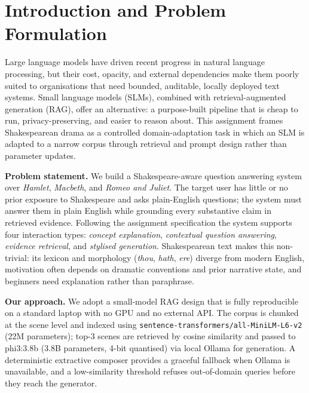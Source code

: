 \documentclass[10pt,conference]{IEEEtran}
\begin{document}
\section{Introduction and Problem Formulation}
\label{sec:introduction}


Large language models have driven recent progress in natural language
processing, but their cost, opacity, and external dependencies make
them poorly suited to organisations that need bounded, auditable,
locally deployed text systems. Small language models (SLMs), combined
with retrieval-augmented generation (RAG), offer an alternative: a
purpose-built pipeline that is cheap to run, privacy-preserving, and
easier to reason about. This assignment frames Shakespearean drama as
a controlled domain-adaptation task in which an SLM is adapted to a
narrow corpus through retrieval and prompt design rather than
parameter updates.

\textbf{Problem statement.} We build a Shakespeare-aware question
answering system over \emph{Hamlet}, \emph{Macbeth}, and
\emph{Romeo and Juliet}. The target user has little or no prior
exposure to Shakespeare and asks plain-English questions; the system
must answer them in plain English while grounding every substantive
claim in retrieved evidence. Following the assignment specification
the system supports four interaction types: \emph{concept
explanation}, \emph{contextual question answering}, \emph{evidence
retrieval}, and \emph{stylised generation}. Shakespearean text makes
this non-trivial: its lexicon and morphology (\emph{thou}, \emph{hath},
\emph{ere}) diverge from modern English, motivation often depends on
dramatic conventions and prior narrative state, and beginners need
explanation rather than paraphrase.

\textbf{Our approach.} We adopt a small-model RAG design that is
fully reproducible on a standard laptop with no GPU and no external
API. The corpus is chunked at the scene level and indexed using
\verb|sentence-transformers/all-MiniLM-L6-v2| (22M parameters); top-3
scenes are retrieved by cosine similarity and passed to phi3:3.8b
(3.8B parameters, 4-bit quantised) via local Ollama for generation.
A deterministic extractive composer provides a graceful fallback
when Ollama is unavailable, and a low-similarity threshold refuses
out-of-domain queries before they reach the generator.
\end{document}
